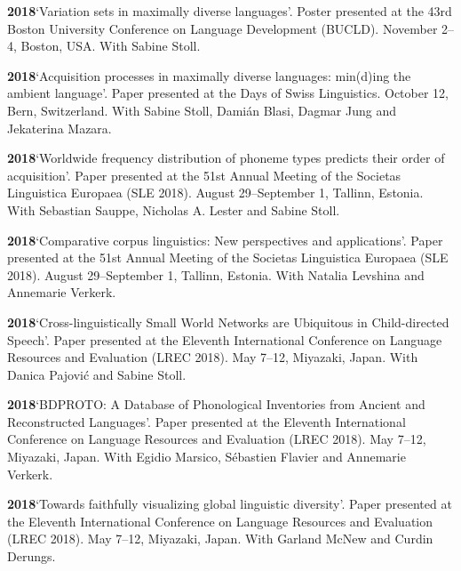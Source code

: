 \documentclass[11pt]{article}
\newcommand{\hangpara}{
 \setlength{\parindent}{0in} %
 \hangindent=0.42in %
}
\begin{document}
\hangpara
\vskip 6pt
{\bf 2018}\hspace{1ex}`Variation sets in maximally diverse languages'. Poster presented at the 43rd Boston University Conference on Language Development (BUCLD). November 2--4, Boston, USA. With Sabine Stoll.

\hangpara
\vskip 6pt
{\bf 2018}\hspace{1ex}`Acquisition processes in maximally diverse languages: min(d)ing the ambient language'. Paper presented at the Days of Swiss Linguistics. October 12, Bern, Switzerland. With Sabine Stoll, Damián Blasi, Dagmar Jung and Jekaterina Mazara.

\vskip 6pt
\hangpara
{\bf 2018}\hspace{1ex}`Worldwide frequency distribution of phoneme types predicts their order of acquisition'. Paper presented at the 51st Annual Meeting of the Societas Linguistica Europaea (SLE 2018). August 29--September 1, Tallinn, Estonia. With Sebastian Sauppe, Nicholas A. Lester and Sabine Stoll.

\vskip 6pt
\hangpara
{\bf 2018}\hspace{1ex}`Comparative corpus linguistics: New perspectives and applications'. Paper presented at the 51st Annual Meeting of the Societas Linguistica Europaea (SLE 2018). August 29--September 1, Tallinn, Estonia. With Natalia Levshina and Annemarie Verkerk.

\vskip 6pt
\hangpara
{\bf 2018}\hspace{1ex}`Cross-linguistically Small World Networks are Ubiquitous in Child-directed Speech'. Paper presented at the Eleventh International Conference on Language Resources and Evaluation (LREC 2018). May 7--12, Miyazaki, Japan. With Danica Pajovi{\'c} and Sabine Stoll.

\vskip 6pt
\hangpara
{\bf 2018}\hspace{1ex}`BDPROTO: A Database of Phonological Inventories from Ancient and Reconstructed Languages'. Paper presented at the Eleventh International Conference on Language Resources and Evaluation (LREC 2018). May 7--12, Miyazaki, Japan. With Egidio Marsico, Sébastien Flavier and Annemarie Verkerk.

\vskip 6pt
\hangpara
{\bf 2018}\hspace{1ex}`Towards faithfully visualizing global linguistic diversity'. Paper presented at the Eleventh International Conference on Language Resources and Evaluation (LREC 2018). May 7--12, Miyazaki, Japan. With Garland McNew and Curdin Derungs.
\end{document}
